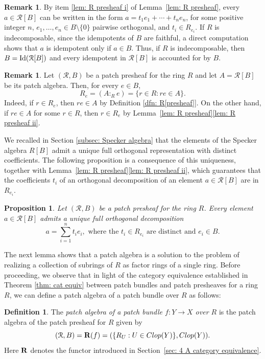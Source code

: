 \documentclass[11pt]{amsart}
\newtheorem{proposition}[theorem]{Proposition}
\theoremstyle{definition}
\newtheorem{definition}[theorem]{Definition}
\newtheorem{remark}[theorem]{Remark}
\def\Id{\mbox{\rm Id}}
\def\cal{\mathcal}
\begin{document}
\begin{remark}\label{rem: R indecomposable} By item \ref{lem: R presheaf i} of Lemma~\ref{lem: R presheaf}, every $a\in {\cal R}[B]$ can be written in the form $a=t_1e_1 + \cdots + t_n e_n$, for some positive integer $n$, $e_1,\ldots,e_n \in B\setminus\{0\}$ pairwise orthogonal, and $t_i \in R_{e_i}$. If $R$ is indecomposable, since the idempotents of $B$ are faithful, a direct computation shows that $a$ is idempotent only if $a\in B$. Thus, if $R$ is indecomposable, then $B=\Id({\cal R}[B])$ and  every idempotent in ${\cal R}[B]$ is accounted for by $B$.
\end{remark}

\begin{remark}\label{rem: patch presheaf from patch algebra}
  Let $({\cal R},B)$ be a patch presheaf for the ring $R$ and let $A={\cal R}[B]$ be its patch algebra. Then, for every $e\in B$, \[R_e=( A :_R e)=\{ r\in R : re\in A\}.\]
  Indeed, if $r\in R_e$, then $re\in A$ by Definition \ref{dfn: R[presheaf]}. On the other hand, if $re\in A$ for some $r\in R$, then $r\in R_e$ by Lemma~\ref{lem: R presheaf}\ref{lem: R presheaf ii}.
\end{remark} 

We recalled in Section \ref{subsec: Specker algebra} that the elements of the Specker algebra $R[B]$ admit a unique full orthogonal representation with distinct coefficients. The following proposition is a consequence of this uniqueness, together with Lemma~\ref{lem: R presheaf}\ref{lem: R presheaf ii}, which guarantees that the coefficients $t_i$ of an orthogonal decomposition of an element $a\in\cal R[B]$ are in $R_{e_i}$.

\begin{proposition}\label{prop: unique full orth form}
    Let $({\cal R}, B)$ be a patch presheaf for the ring $R$. Every element $a\in {\cal R}[B]$ admits a unique full orthogonal decomposition
    \[ a=\sum_{i=1}^n t_i e_i, \text{ where the }t_i\in R_{e_i}\text{ are distinct and }e_i\in B.\]
\end{proposition}


The next lemma shows that a patch algebra is a solution to the problem of realizing a collection  of subrings of $R$ as factor rings of a single ring. Before proceeding, we observe that in light of the category equivalence established in Theorem \ref{thm: cat equiv} between patch bundles and patch presheaves for a ring $R$, we can define a patch algebra of a patch bundle over $R$ as follows:
\begin{definition}\label{dfn: patch algebra of a patch bundle}
   The {\it patch algebra of a patch bundle $f:Y \rightarrow X$ over $R$} is the patch algebra of the patch presheaf for $R$ given by
   $$({\cal R}, B)={\bf R}(f)=(\{R_U : U\in {\rm Clop}(Y)\}, {\rm Clop}(Y)).$$ Here ${\bf R}$ denotes the functor introduced in Section~\ref{sec: 4 A category equivalence}.  
\end{definition}
\end{document}
